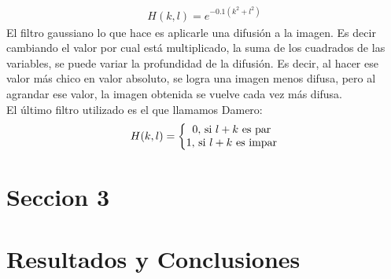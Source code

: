 \documentclass[11pt,a4paper]{emulateapj}
\begin{document}
\begin{eqnarray}
H(k,l) = e^{-0.1(k^2 + l^2)}
\end{eqnarray}
El filtro gaussiano lo que hace es aplicarle una difusión a la imagen. Es decir cambiando el valor por cual está multiplicado, la suma de los cuadrados de las variables, se puede variar la profundidad de la difusión. Es decir, al hacer ese valor más chico en valor absoluto, se logra una imagen menos difusa, pero al agrandar ese valor, la imagen obtenida se vuelve cada vez más difusa.
\\
El último filtro utilizado es el que llamamos Damero:
\begin{eqnarray}
H(k,l) = \left\{
	\begin{matrix}
		0,$ si $l+k$ es par$\\
		1,$ si $l+k$ es impar$\\
	\end{matrix} 
	\right.
\end{eqnarray}


\section{Seccion 3}
\label{sec:sec3}




\section{Resultados y Conclusiones}
\label{sec:resultadosyconclusiones}

%

\end{document}
